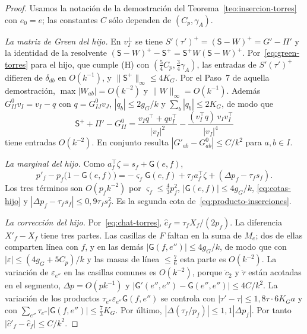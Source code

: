 \begin{proof}
Usamos la notación de la demostración del Teorema~\ref{teo:insercion-torres} con $e_0=e$; las constantes
$C$ sólo dependen de $(C_p,\gamma_A)$.

\emph{La matriz de Green del hijo.} En $v_I^\perp$ se tiene $S'(\tau')^+=(\mathsf S-W)^+=G'-\Pi'$ y la
identidad de la resolvente $(\mathsf S-W)^+-\mathsf S^+=\mathsf S^+W(\mathsf S-W)^+$.
Por~\eqref{eq:green-torres} para el hijo, que cumple \textup{(H)} con
$(\tfrac54C_p,\tfrac34\gamma_A)$, las entradas de $S'(\tau')^+$ difieren de $\delta_{db}$ en
$O(k^{-1})$, y $\|\mathsf S^+\|_\infty\le4K_G$. Por el Paso~7 de aquella demostración,
$\max|W_{ab}|=O(k^{-2})$ y $\|W\|_\infty=O(k^{-1})$. Además $G^0_{II}v_I=v_I-q$ con $q=G^0_{IJ}v_J$,
$|q_b|\le2g_G/k$ y $\sum_b|q_b|\le2K_G$, de modo que
\[
 \mathsf S^++\Pi'-G^0_{II}=\frac{v_Iq^\top+qv_I^\top}{|v_I|^2}-\frac{(v_I^\top q)\,v_Iv_I^\top}{|v_I|^4}
\]
tiene entradas $O(k^{-2})$. En conjunto resulta $|G'_{ab}-G^0_{ab}|\le C/k^2$ para $a,b\in I$.

\emph{La marginal del hijo.} Como $a_f^\top\zeta=s_f+\mathsf G(e,f)$,
\[
 p'_f-p_f\bigl(1-\mathsf G(e,f)\bigr)=-\varsigma_f\mathsf G(e,f)+\tau_fa_f^\top\zeta
   +(\Delta p_f-\tau_fs_f).
\]
Los tres términos son $O(p_fk^{-2})$ por $\varsigma_f\le\tfrac43p_f^2$, $|\mathsf G(e,f)|\le4g_G/k$,
\eqref{eq:cotas-hijo} y $|\Delta p_f-\tau_fs_f|\le0{,}9\tau_fs_f^2$. Es la segunda cota
de~\eqref{eq:producto-inserciones}.

\emph{La corrección del hijo.} Por~\eqref{eq:chat-torres}, $\hat c_f=\tau_fX_f/(2p_f)$. La diferencia
$X'_f-X_f$ tiene tres partes. Las casillas de $F$ faltan en la suma de $M_e$; dos de ellas comparten
línea con $f$, y en las demás $|\mathsf G(f,e'')|\le4g_G/k$, de modo que con
$|\varepsilon|\le(4g_G+5C_p)/k$ y las masas de línea $\le\tfrac76$ esta parte es $O(k^{-2})$. La
variación de $\varepsilon_{e''}$ en las casillas comunes es $O(k^{-2})$, porque $\ddot c_2$ y
$\ddot\tau$ están acotadas en el segmento, $\Delta p=O(pk^{-1})$ y
$|\mathsf G'(e'',e'')-\mathsf G(e'',e'')|\le4C/k^2$. La variación de los productos
$\tau_{e''}\varepsilon_{e''}\mathsf G(f,e'')$ se controla con $|\tau'-\tau|\le1{,}8\tau\cdot6K_Ga$ y con
$\sum_{e''}\tau_{e''}|\mathsf G(f,e'')|\le\tfrac73K_G$. Por último,
$|\Delta(\tau_f/p_f)|\le1{,}1|\Delta p_f|$. Por tanto $|\hat c'_f-\hat c_f|\le C/k^2$.


\end{proof}
